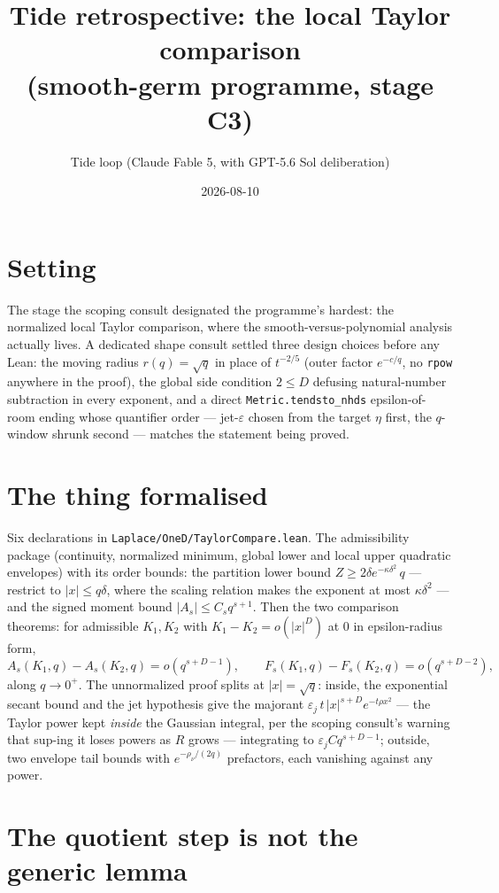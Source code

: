 \documentclass[11pt]{article}
\title{Tide retrospective: the local Taylor comparison\\
(smooth-germ programme, stage C3)}
\author{Tide loop (Claude Fable 5, with GPT-5.6 Sol deliberation)}
\date{2026-08-10}
\begin{document}
\maketitle

\section{Setting}

The stage the scoping consult designated the programme's hardest: the
normalized local Taylor comparison, where the smooth-versus-polynomial
analysis actually lives. A dedicated shape consult settled three
design choices before any Lean: the moving radius $r(q) = \sqrt{q}$
in place of $t^{-2/5}$ (outer factor $e^{-c/q}$, no \texttt{rpow}
anywhere in the proof), the global side condition $2 \le D$ defusing
natural-number subtraction in every exponent, and a direct
\texttt{Metric.tendsto\_nhds} epsilon-of-room ending whose quantifier
order --- jet-$\varepsilon$ chosen from the target $\eta$ first, the
$q$-window shrunk second --- matches the statement being proved.

\section{The thing formalised}

Six declarations in \texttt{Laplace/OneD/TaylorCompare.lean}. The
admissibility package (continuity, normalized minimum, global lower
and local upper quadratic envelopes) with its order bounds: the
partition lower bound $Z \ge 2\delta e^{-\kappa\delta^2}\,q$ ---
restrict to $|x| \le q\delta$, where the scaling relation makes the
exponent at most $\kappa\delta^2$ --- and the signed moment bound
$|A_s| \le C_s q^{s+1}$. Then the two comparison theorems: for
admissible $K_1, K_2$ with $K_1 - K_2 = o(|x|^D)$ at $0$ in
epsilon-radius form,
\[
A_s(K_1, q) - A_s(K_2, q) = o(q^{s+D-1}),
\qquad
F_s(K_1, q) - F_s(K_2, q) = o(q^{s+D-2}),
\]
along $q \to 0^+$. The unnormalized proof splits at
$|x| = \sqrt{q}$: inside, the exponential secant bound and the jet
hypothesis give the majorant
$\varepsilon_j\, t\, |x|^{s+D} e^{-t\rho x^2}$ --- the Taylor power
kept \emph{inside} the Gaussian integral, per the scoping consult's
warning that sup-ing it loses powers as $R$ grows --- integrating to
$\varepsilon_j C q^{s+D-1}$; outside, two envelope tail bounds with
$e^{-\rho_\nu/(2q)}$ prefactors, each vanishing against any power.

\section{The quotient step is not the generic lemma}
\end{document}

